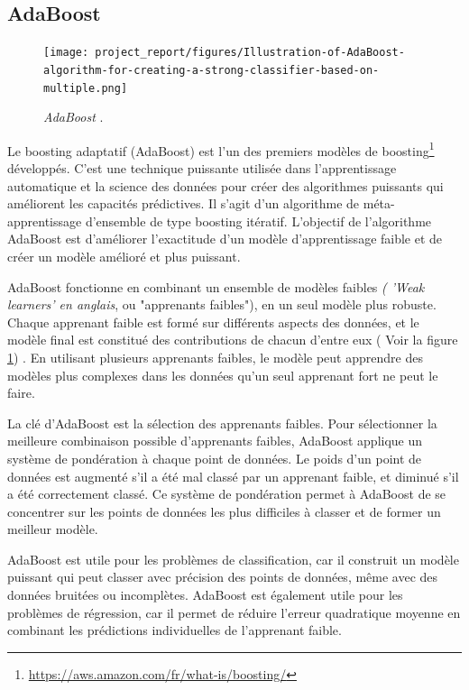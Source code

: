 \subsection{AdaBoost}

\begin{figure}[h]
    \centering
    \texttt{[image: project\_report/figures/Illustration-of-AdaBoost-algorithm-for-creating-a-strong-classifier-based-on-multiple.png]} 
    \caption{\textit{AdaBoost} \cite{researchgate2024}.}
        \label{fig:figure3}
 
\end{figure}

Le boosting adaptatif (AdaBoost) est l'un des premiers modèles de boosting\footnote{\href{https://aws.amazon.com/fr/what-is/boosting/}{https://aws.amazon.com/fr/what-is/boosting/}} développés. 
C'est \cite{fineproxy2024} une technique puissante utilisée dans l'apprentissage automatique et la science des données pour créer des algorithmes puissants qui améliorent les capacités prédictives. Il s'agit d'un algorithme de méta-apprentissage d'ensemble de type boosting itératif. L'objectif de l'algorithme AdaBoost est d'améliorer l'exactitude d'un modèle d'apprentissage faible et de créer un modèle amélioré et plus puissant.

AdaBoost fonctionne en combinant un ensemble de modèles faibles \textit{( 'Weak learners' en anglais}, ou "apprenants faibles"), en un seul modèle plus robuste. Chaque apprenant faible est formé sur différents aspects des données, et le modèle final est constitué des contributions de chacun d'entre eux ( Voir la figure \ref{fig:figure3}) . En utilisant plusieurs apprenants faibles, le modèle peut apprendre des modèles plus complexes dans les données qu'un seul apprenant fort ne peut le faire.\par

La clé d'AdaBoost est la sélection des apprenants faibles. Pour sélectionner la meilleure combinaison possible d'apprenants faibles, AdaBoost applique un système de pondération à chaque point de données. Le poids d'un point de données est augmenté s'il a été mal classé par un apprenant faible, et diminué s'il a été correctement classé. Ce système de pondération permet à AdaBoost de se concentrer sur les points de données les plus difficiles à classer et de former un meilleur modèle. \par

AdaBoost est utile pour les problèmes de classification, car il construit un modèle puissant qui peut classer avec précision des points de données, même avec des données bruitées ou incomplètes. AdaBoost est également utile pour les problèmes de régression, car il permet de réduire l'erreur quadratique moyenne en combinant les prédictions individuelles de l'apprenant faible.

